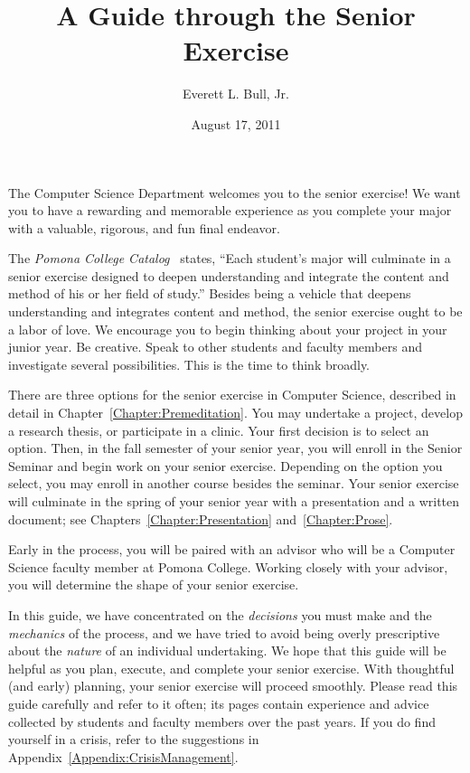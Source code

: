 \documentclass[finalcopy]{srpaper}
\title{A Guide through the Senior Exercise}
\author{Everett L. Bull, Jr.}
\date{August 17, 2011}
\def\hyperref[#1]{}
\let\plainref\ref
\newcommand{\plainref}{\ref*}
\newcommand{\namedref}[2]{\hyperref[#2]{#1~\plainref{#2}}}
\begin{document}
\frontmatter


%
%
\preface
The Computer Science Department welcomes you to the senior
exercise! We want you to have a rewarding and memorable
experience as you complete your major with a valuable,
rigorous, and fun final endeavor.

The \textit{Pomona College Catalog}~\cite{PomonaCatalog}
states, ``Each student's major will culminate in a senior
exercise designed to deepen understanding and integrate the
content and method of his or her field of study.'' Besides
being a vehicle that deepens understanding and integrates
content and method, the senior exercise ought to be a labor
of love. We encourage you to begin thinking about your
project in your junior year. Be creative. Speak to other
students and faculty members and investigate several
possibilities. This is the time to think broadly.

There are three options for the senior exercise in Computer
Science, described in detail in
\namedref{Chapter}{Chapter:Premeditation}. You may undertake
a project, develop a research thesis, or participate in a
clinic. Your first decision is to select an option. Then, in
the fall semester of your senior year, you will enroll in
the Senior Seminar and begin work on your senior
exercise. Depending on the option you select, you may enroll
in another course besides the seminar. Your senior exercise
will culminate in the spring of your senior year with a
presentation and a written document; see
\namedref{Chapters}{Chapter:Presentation}
and~\ref{Chapter:Prose}.

Early in the process, you will be paired with an advisor who
will be a Computer Science faculty member at Pomona
College. Working closely with your advisor, you will
determine the shape of your senior exercise.

In this guide, we have concentrated on the \emph{decisions}
you must make and the \emph{mechanics} of the process, and
we have tried to avoid being overly prescriptive about the
\emph{nature} of an individual undertaking.  We hope that
this guide will be helpful as you plan, execute, and
complete your senior exercise. With thoughtful (and early)
planning, your senior exercise will proceed smoothly. Please
read this guide carefully and refer to it often; its pages
contain experience and advice collected by students and
faculty members over the past years. If you do find yourself
in a crisis, refer to the suggestions in
\namedref{Appendix}{Appendix:CrisisManagement}.
\end{document}
